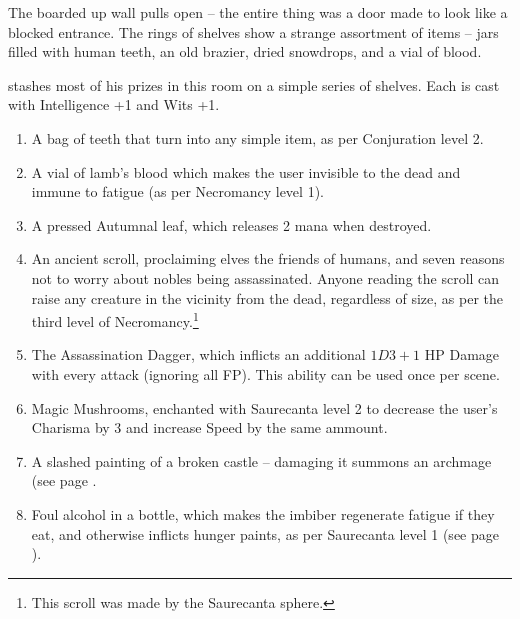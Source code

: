 
\sentientundeadhobgoblin


\begin{boxtext}

	The boarded up wall pulls open -- the entire thing was a door made to look like a blocked entrance.  The rings of shelves show a strange assortment of items -- jars filled with human teeth, an old brazier, dried snowdrops, and a vial of blood.

\end{boxtext}

 stashes most of his prizes in this room on a simple series of shelves.  Each is cast with Intelligence +1 and Wits +1.

\begin{enumerate}

	\item{A bag of teeth that turn into any simple item, as per Conjuration level 2.}
	\item{A vial of lamb's blood which makes the user invisible to the dead and immune to fatigue (as per Necromancy level 1).}
	\item{A pressed Autumnal leaf, which releases 2 mana when destroyed.}
	\item{An ancient scroll, proclaiming elves the friends of humans, and seven reasons not to worry about nobles being assassinated.  Anyone reading the scroll can raise any creature in the vicinity from the dead, regardless of size, as per the third level of Necromancy.\footnote{This scroll was made by the Saurecanta sphere.}}
	\item{The Assassination Dagger, which inflicts an additional $1D3+1$ HP Damage with every attack (ignoring all FP).  This ability can be used once per scene.}
	\item{Magic Mushrooms, enchanted with Saurecanta level 2 to decrease the user's Charisma by 3 and increase Speed by the same ammount.}
	\item{A slashed painting of a broken castle -- damaging it summons an archmage (see page \pageref{archmage}.}
	\item{Foul alcohol in a bottle, which makes the imbiber regenerate fatigue if they eat, and otherwise inflicts hunger paints, as per Saurecanta level 1 (see page \pageref{saurecantaone}).}
\end{enumerate}


